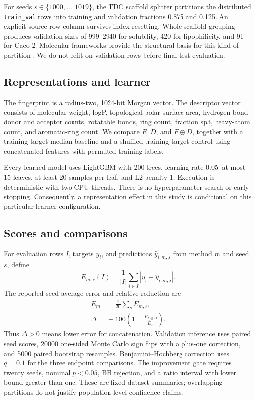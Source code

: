 \documentclass[10pt,twocolumn,a4paper]{article}
\theoremstyle{definition}\newtheorem{observation}{Numerical observation}
\theoremstyle{remark}\newtheorem{remark}{Remark}
\newcommand{\code}[1]{\texttt{\small #1}}
\begin{document}
For seeds $s\in\{1000,\ldots,1019\}$, the TDC scaffold splitter partitions the distributed \code{train\_val} rows into training and validation fractions 0.875 and 0.125. An explicit source-row column survives index resetting. Whole-scaffold grouping produces validation sizes of 999--2940 for solubility, 420 for lipophilicity, and 91 for Caco-2. Molecular frameworks provide the structural basis for this kind of partition \cite{bemis}. We do not refit on validation rows before final-test evaluation.

\subsection{Representations and learner}
The fingerprint is a radius-two, 1024-bit Morgan vector. The descriptor vector consists of molecular weight, logP, topological polar surface area, hydrogen-bond donor and acceptor counts, rotatable bonds, ring count, fraction sp3, heavy-atom count, and aromatic-ring count. We compare $F$, $D$, and $F\oplus D$, together with a training-target median baseline and a shuffled-training-target control using concatenated features with permuted training labels.

Every learned model uses LightGBM with 200 trees, learning rate 0.05, at most 15 leaves, at least 20 samples per leaf, and L2 penalty 1. Execution is deterministic with two CPU threads. There is no hyperparameter search or early stopping. Consequently, a representation effect in this study is conditional on this particular learner configuration.

\subsection{Scores and comparisons}
For evaluation rows $I$, targets $y_i$, and predictions $\widehat y_{i,m,s}$ from method $m$ and seed $s$, define
\begin{equation}\label{eq:mae}
E_{m,s}(I)=\frac{1}{|I|}\sum_{i\in I}|y_i-\widehat y_{i,m,s}|.
\end{equation}
The reported seed-average error and relative reduction are
\begin{align}
\overline E_m&=\frac1{20}\sum_s E_{m,s},\label{eq:mean}\\
\Delta&=100\left(1-\frac{\overline E_{F\oplus D}}{\overline E_F}\right).\label{eq:reduction}
\end{align}
Thus $\Delta>0$ means lower error for concatenation. Validation inference uses paired seed scores, 20000 one-sided Monte Carlo sign flips with a plus-one correction, and 5000 paired bootstrap resamples. Benjamini--Hochberg correction uses $q=0.1$ for the three endpoint comparisons. The improvement gate requires twenty seeds, nominal $p<0.05$, BH rejection, and a ratio interval with lower bound greater than one. These are fixed-dataset summaries; overlapping partitions do not justify population-level confidence claims.
\end{document}

